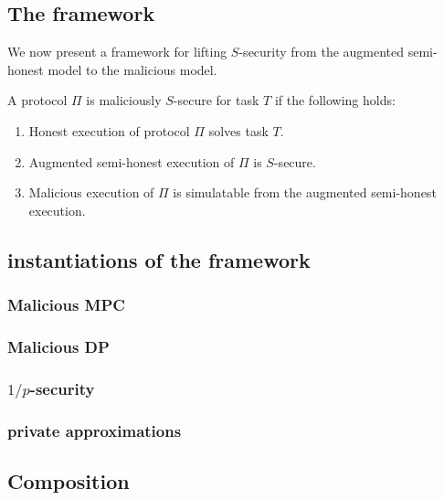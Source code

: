 \documentclass[11pt]{article}
\begin{document}
\subsection{The framework}

We now present a framework for lifting $S$-security from the augmented semi-honest model to the malicious model.

\begin{definition}
A protocol $\Pi$ is maliciously $S$-secure for task $T$ if the following holds:
\begin{enumerate}
    \item Honest execution of protocol $\Pi$ solves task $T$.
    \item Augmented semi-honest execution of $\Pi$ is $S$-secure.
    \item Malicious execution of $\Pi$ is simulatable from the augmented semi-honest execution.
\end{enumerate}

\subsection{instantiations of the framework}

\subsubsection{Malicious MPC}

\subsubsection{Malicious DP}

\subsubsection{$1/p$-security}

\subsubsection{private approximations}

\subsection{Composition}

\end{definition}





\end{document}
